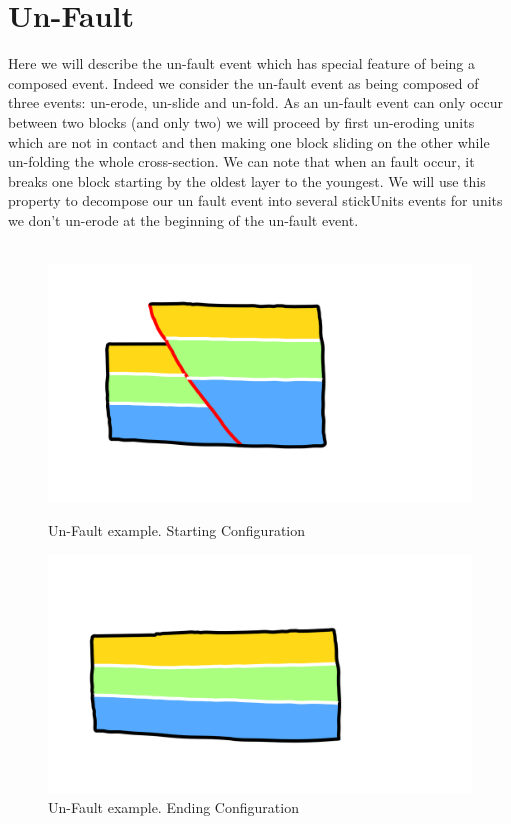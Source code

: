 \documentclass[12pt, a4paper]{report} %
\begin{document}
\section{Un-Fault}

Here we will describe the un-fault event which has special feature of being a composed event. Indeed we consider the un-fault event as being composed of three events: un-erode, un-slide and un-fold. As an un-fault event can only occur between two blocks (and only two) we will proceed by first un-eroding units which are not in contact and then making one block sliding on the other while un-folding the whole cross-section. We can note that when an fault occur, it breaks one block starting by the oldest layer to the youngest. We will use this property to decompose our un fault event into several stickUnits events for units we don't un-erode at the beginning of the un-fault event.\\\\
\begin{figure}[h]
    \begin{minipage}[c]{.46\linewidth}
        \centering
        \includegraphics[scale=0.2]{unFaultDescription0.png}
	\caption{Un-Fault example. Starting Configuration}
    \end{minipage}
    \hfill%
    \begin{minipage}[c]{.46\linewidth}
        \centering
        \includegraphics[scale=0.2]{unFaultDescription1.png}
	\caption{Un-Fault example. Ending Configuration}
    \end{minipage}
\end{figure}
\end{document}
